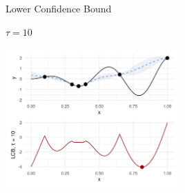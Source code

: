 \documentclass[11pt,compress,t,notes=noshow, xcolor=table]{beamer}
\begin{document}
\begin{vbframe}{Lower Confidence Bound}
\framebreak

$\tau = 10$

\begin{center}
  \includegraphics[width = 0.5\textwidth]{figure_man/bayesian_loop_lcb_2.png}
\end{center}

\end{vbframe}
\end{document}
